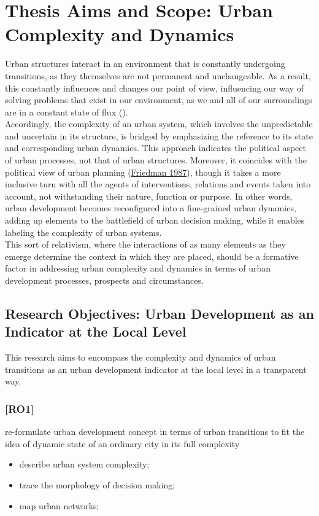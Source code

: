 \documentclass[11pt]{report}
\begin{document}
{{\section{Thesis Aims and Scope: Urban Complexity and Dynamics}

Urban structures interact in an environment that is constantly undergoing transitions, as they themselves are not permanent and unchangeable. As a result, this constantly influences and changes our point of view, influencing our way of solving problems that exist in our environment, as we and all of our surroundings are in a constant state of flux (\citealt{harvey_condition_2003}).
\\
Accordingly, the complexity of an urban system, which involves the unpredictable and uncertain in its structure, is bridged by emphasizing the reference to its state and corresponding urban dynamics. This approach indicates the political aspect of urban processes, not that of urban structures.  Moreover, it coincides with the political view of urban planning (\href{ref}{Friedman 1987}), though it takes a more inclusive turn with all the agents of interventions, relations and events taken into account, not withstanding their nature, function or purpose. In other words, urban development becomes reconfigured into a fine-grained urban dynamics, adding up elements to the battlefield of urban decision making, while it enables labeling the complexity of urban systems.
\\

This sort of relativism, where the interactions of as many elements as they emerge determine the context in which they are placed, should be a formative factor in addressing urban complexity and dynamics in terms of urban development processes, prospects and circumstances.

\subsection{Research Objectives: Urban Development as an Indicator at the Local Level}

This research aims to encompass the complexity and dynamics of urban transitions as an urban development indicator at the local level in a transparent way.

\subsubsection{[RO1]}
re-formulate urban development concept in terms of urban transitions to fit the idea of dynamic state of an ordinary city in its full complexity
\begin{itemize}
\item describe urban system complexity;
\item trace the morphology of decision making;
\item map urban networks;
\end{itemize}

}}
\end{document}
